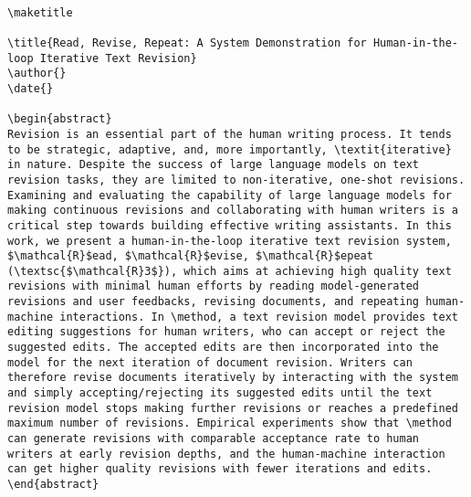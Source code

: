 \begin{table}[h!]
\centering
\begin{minipage}{\linewidth}
\lstset{
    basicstyle=\ttfamily\footnotesize, %
    breaklines=true, %
    frame=single, %
    columns=fullflexible, %
    captionpos=b %
}
\begin{lstlisting}

\maketitle

\title{Read, Revise, Repeat: A System Demonstration for Human-in-the-loop Iterative Text Revision}
\author{}
\date{}

\begin{abstract}
Revision is an essential part of the human writing process. It tends to be strategic, adaptive, and, more importantly, \textit{iterative} in nature. Despite the success of large language models on text revision tasks, they are limited to non-iterative, one-shot revisions. Examining and evaluating the capability of large language models for making continuous revisions and collaborating with human writers is a critical step towards building effective writing assistants. In this work, we present a human-in-the-loop iterative text revision system, $\mathcal{R}$ead, $\mathcal{R}$evise, $\mathcal{R}$epeat (\textsc{$\mathcal{R}3$}), which aims at achieving high quality text revisions with minimal human efforts by reading model-generated revisions and user feedbacks, revising documents, and repeating human-machine interactions. In \method, a text revision model provides text editing suggestions for human writers, who can accept or reject the suggested edits. The accepted edits are then incorporated into the model for the next iteration of document revision. Writers can therefore revise documents iteratively by interacting with the system and simply accepting/rejecting its suggested edits until the text revision model stops making further revisions or reaches a predefined maximum number of revisions. Empirical experiments show that \method can generate revisions with comparable acceptance rate to human writers at early revision depths, and the human-machine interaction can get higher quality revisions with fewer iterations and edits. 
\end{abstract}


\end{lstlisting}
\vspace{-3mm}
\label{table:seed-entry-read}
\end{minipage}
\end{table}



